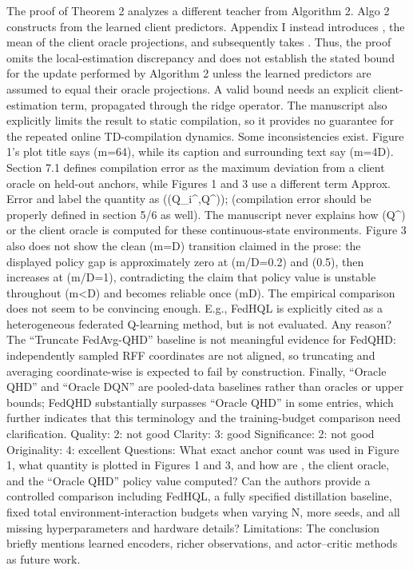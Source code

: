The proof of Theorem 2 analyzes a different teacher from Algorithm 2. Algo 2 constructs 
 from the learned client predictors. Appendix I instead introduces 
, the mean of the client oracle projections, and subsequently takes 
. Thus, the proof omits the local-estimation discrepancy 
 and does not establish the stated bound for the update performed by Algorithm 2 unless the learned predictors are assumed to equal their oracle projections. A valid bound needs an explicit client-estimation term, propagated through the ridge operator. The manuscript also explicitly limits the result to static compilation, so it provides no guarantee for the repeated online TD-compilation dynamics.
Some inconsistencies exist. Figure 1’s plot title says (m=64), while its caption and surrounding text say (m=4D). Section 7.1 defines compilation error as the maximum deviation from a client oracle on held-out anchors, while Figures 1 and 3 use a different term Approx. Error and label the quantity as ((Q_i^{},Q^\star)); (compilation error should be properly defined in section 5/6 as well). The manuscript never explains how (Q^\star) or the client oracle is computed for these continuous-state environments. Figure 3 also does not show the clean (m=D) transition claimed in the prose: the displayed policy gap is approximately zero at (m/D=0.2) and (0.5), then increases at (m/D=1), contradicting the claim that policy value is unstable throughout (m<D) and becomes reliable once (m\ge D).
The empirical comparison does not seem to be convincing enough. E.g., FedHQL is explicitly cited as a heterogeneous federated Q-learning method, but is not evaluated. Any reason? The “Truncate FedAvg-QHD” baseline is not meaningful evidence for FedQHD: independently sampled RFF coordinates are not aligned, so truncating and averaging coordinate-wise is expected to fail by construction. Finally, “Oracle QHD” and “Oracle DQN” are pooled-data baselines rather than oracles or upper bounds; FedQHD substantially surpasses “Oracle QHD” in some entries, which further indicates that this terminology and the training-budget comparison need clarification.
Quality: 2: not good
Clarity: 3: good
Significance: 2: not good
Originality: 4: excellent
Questions:
What exact anchor count was used in Figure 1, what quantity is plotted in Figures 1 and 3, and how are 
, the client oracle, and the “Oracle QHD” policy value computed?
Can the authors provide a controlled comparison including FedHQL, a fully specified distillation baseline, fixed total environment-interaction budgets when varying N, more seeds, and all missing hyperparameters and hardware details?
Limitations:
The conclusion briefly mentions learned encoders, richer observations, and actor–critic methods as future work.


